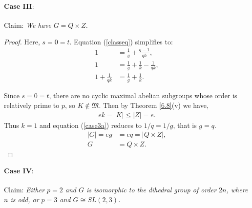 \documentclass[a4paper , 11pt]{book}
\theoremstyle{definition}
\theoremstyle{remark}
\begin{document}
\vspace{-1mm}
\textbf{Case III}:\\
\\
Claim: \textit{We have $G = Q \times Z$.}
\\
\begin{proof} Here, $s = 0 = t$. Equation (\ref{classeq}) simplifies to:
\begin{align}\label{case3a} 1 &= \frac{1}{g} + \frac{q-1}{qk}, \nonumber
\\ 1 &= \frac{1}{g} + \frac{1}{k} - \frac{1}{qk}, \nonumber
\\ 1 + \frac{1}{qk} &= \frac{1}{g} + \frac{1}{k}.
\end{align}

Since $s = 0 = t$, there are no cyclic maximal abelian subgroups whose order is relatively prime to $p$, so $K \not \in \mathfrak{M}$. Then by Theorem \ref{6.8}(v) we have,
\begin{align*} ek = |K| \leq |Z| = e.
\end{align*} 
Thus $k = 1$ and equation (\ref{case3a}) reduces to $1/q = 1/g$, that is $g=q$.
\begin{align*} |G| =  eg &= eq = |Q \times Z|,
\\ G &= Q \times Z.
\end{align*}
\qedhere
\end{proof}
\vspace{-1mm}
\textbf{Case IV}:\\
\\
Claim: \textit{Either $p=2$ and $G$ is isomorphic to the dihedral group of order $2n$, where $n$ is odd, or $p=3$ and $G \cong SL(2,3)$.}
\\
\end{document}
